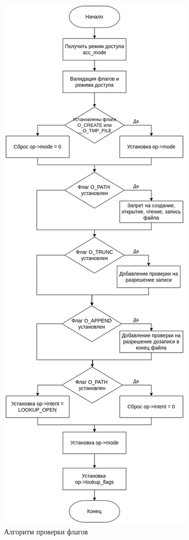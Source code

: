 \documentclass[12pt,a4paper]{scrreprt}
\begin{document}
\begin{figure}[H]
	\centering
	\includegraphics[scale=0.5]{pics/2.png}
	\caption{Алгоритм проверки флагов}
\end{figure}
\end{document}
